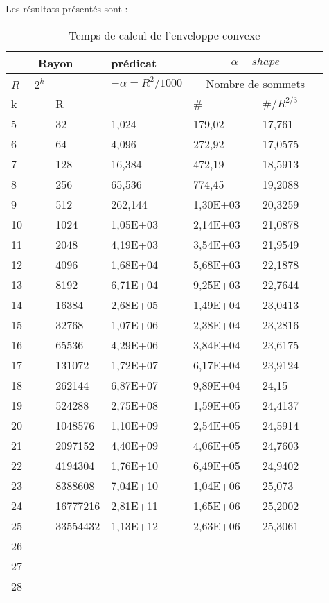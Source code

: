 Les résultats présentés sont : 
\begin{table}[h!]
  \begin{tabular}{|p{0.09\linewidth}|p{0.13\linewidth}||p{0.23\linewidth}||p{0.23\linewidth}|p{0.23\linewidth}|}
    \hline
    \multicolumn{2}{|c||}{Rayon} & prédicat               & \multicolumn{2}{|c|}{$\alpha-shape$} \\  \hline 
    $R=2^k$  &                   & $-\alpha = R^{2}/1000$ & \multicolumn{2}{|c|}{Nombre de sommets} \\ \hline
    k        & R                 &                        & \# & $\# / R^{2/3}$ \\ 
    \hline
    5 & 32 & 1,024 & 179,02 & 17,761\\
    6 & 64 & 4,096 & 272,92 & 17,0575\\
    7 & 128 & 16,384 & 472,19 & 18,5913\\
    8 & 256 & 65,536 & 774,45 & 19,2088\\
    9 & 512 & 262,144 & 1,30E+03 & 20,3259\\
    10 & 1024 & 1,05E+03 & 2,14E+03 & 21,0878\\
    11 & 2048 & 4,19E+03 & 3,54E+03 & 21,9549\\
    12 & 4096 & 1,68E+04 & 5,68E+03 & 22,1878\\
    13 & 8192 & 6,71E+04 & 9,25E+03 & 22,7644\\
    14 & 16384 & 2,68E+05 & 1,49E+04 & 23,0413\\
    15 & 32768 & 1,07E+06 & 2,38E+04 & 23,2816\\
    16 & 65536 & 4,29E+06 & 3,84E+04 & 23,6175\\
    17 & 131072 & 1,72E+07 & 6,17E+04 & 23,9124\\
    18 & 262144 & 6,87E+07 & 9,89E+04 & 24,15\\
    19 & 524288 & 2,75E+08 & 1,59E+05 & 24,4137\\
    20 & 1048576 & 1,10E+09 & 2,54E+05 & 24,5914\\
    21 & 2097152 & 4,40E+09 & 4,06E+05 & 24,7603\\
    22 & 4194304 & 1,76E+10 & 6,49E+05 & 24,9402\\
    23 & 8388608 & 7,04E+10 & 1,04E+06 & 25,073\\
    24 & 16777216 & 2,81E+11 & 1,65E+06 & 25,2002\\
    25 & 33554432 & 1,13E+12 & 2,63E+06 & 25,3061\\
    26 &  &  &  & \\
    27 &  &  &  &  \\
    28 &  &  &  &  \\
    \hline
  \end{tabular} 
  \caption{Temps de calcul de l'enveloppe convexe}
\end{table}


